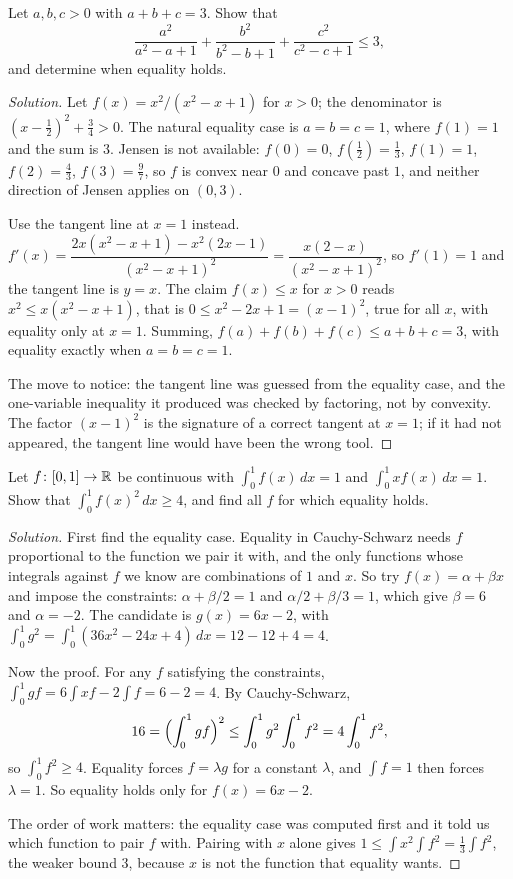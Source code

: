 \begin{example}
Let $a,b,c>0$ with $a+b+c=3$. Show that
\[
\frac{a^2}{a^2-a+1}+\frac{b^2}{b^2-b+1}+\frac{c^2}{c^2-c+1}\le 3,
\]
and determine when equality holds.
\end{example}

\begin{proof}[Solution]
Let $f(x)=x^2/(x^2-x+1)$ for $x>0$; the denominator is $(x-\tfrac12)^2+\tfrac34>0$. The natural equality case is $a=b=c=1$, where $f(1)=1$ and the sum is $3$. Jensen is not available: $f(0)=0$, $f(\tfrac12)=\tfrac13$, $f(1)=1$, $f(2)=\tfrac43$, $f(3)=\tfrac97$, so $f$ is convex near $0$ and concave past $1$, and neither direction of Jensen applies on $(0,3)$.

Use the tangent line at $x=1$ instead. $f'(x)=\dfrac{2x(x^2-x+1)-x^2(2x-1)}{(x^2-x+1)^2}=\dfrac{x(2-x)}{(x^2-x+1)^2}$, so $f'(1)=1$ and the tangent line is $y=x$. The claim $f(x)\le x$ for $x>0$ reads $x^2\le x(x^2-x+1)$, that is $0\le x^2-2x+1=(x-1)^2$, true for all $x$, with equality only at $x=1$. Summing, $f(a)+f(b)+f(c)\le a+b+c=3$, with equality exactly when $a=b=c=1$.

The move to notice: the tangent line was guessed from the equality case, and the one-variable inequality it produced was checked by factoring, not by convexity. The factor $(x-1)^2$ is the signature of a correct tangent at $x=1$; if it had not appeared, the tangent line would have been the wrong tool.
\end{proof}

\begin{example}
Let $f\colon[0,1]\to\mathbb{R}$ be continuous with $\int_0^1 f(x)\,dx=1$ and $\int_0^1 xf(x)\,dx=1$. Show that $\int_0^1 f(x)^2\,dx\ge 4$, and find all $f$ for which equality holds.
\end{example}

\begin{proof}[Solution]
First find the equality case. Equality in Cauchy-Schwarz needs $f$ proportional to the function we pair it with, and the only functions whose integrals against $f$ we know are combinations of $1$ and $x$. So try $f(x)=\alpha+\beta x$ and impose the constraints: $\alpha+\beta/2=1$ and $\alpha/2+\beta/3=1$, which give $\beta=6$ and $\alpha=-2$. The candidate is $g(x)=6x-2$, with $\int_0^1 g^2=\int_0^1(36x^2-24x+4)\,dx=12-12+4=4$.

Now the proof. For any $f$ satisfying the constraints, $\int_0^1 g f=6\int xf-2\int f=6-2=4$. By Cauchy-Schwarz,
\[
16=\Bigl(\int_0^1 gf\Bigr)^2\le\int_0^1 g^2\int_0^1 f^2=4\int_0^1 f^2,
\]
so $\int_0^1 f^2\ge 4$. Equality forces $f=\lambda g$ for a constant $\lambda$, and $\int f=1$ then forces $\lambda=1$. So equality holds only for $f(x)=6x-2$.

The order of work matters: the equality case was computed first and it told us which function to pair $f$ with. Pairing with $x$ alone gives $1\le\int x^2\int f^2=\tfrac13\int f^2$, the weaker bound $3$, because $x$ is not the function that equality wants.
\end{proof}

